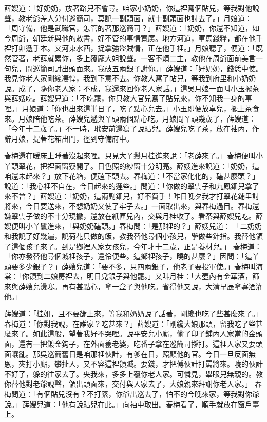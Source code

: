 \begin{showcontents}{}
薛嫂道：「好奶奶，放著路兒不會尋。咱家小奶奶，你這裡寫個貼兒，等我對他說聲，教老爺差人分付巡簡司，莫說一副頭面，就十副頭面也討去了。」月娘道： 「周守備，他是武職官，怎管的著那巡簡司？」薛嫂道：「奶奶，你還不知道，如今周爺，朝廷新與他的敕書，好不管的事情寬廣。地方河道，軍馬錢糧，都在他手裡打卯遞手本。又河東水西，捉拿強盜賊情，正在他手裡。」月娘聽了，便道：「既然管著，老薛就累你，多上覆龐大姐說聲。一客不煩二主，教他在周爺面前美言一句兒，問巡簡司討出頭面來。我破五兩銀子謝你。」薛嫂道：「好奶奶，錢恁中使。我見你老人家剛纔凄惶，我到下意不去。你教人寫了帖兒，等我到府里和小奶奶說。成了，隨你老人家；不成，我還來回你老人家話。」這吳月娘一面叫小玉擺茶與薛嫂吃。薛嫂兒道：「不吃罷，你只教大官兒寫了貼兒來，你不知我一身的事哩。」月娘道：「你也出來這半日了，吃了點心兒去。」小玉即便放卓兒，擺上茶食來。月娘陪他吃茶。薛嫂兒遞與丫頭兩個點心吃。月娘問丫頭幾歲了，薛嫂道： 「今年十二歲了。」不一時，玳安前邊寫了說貼兒。薛嫂兒吃了茶，放在袖內，作辭月娘，提著花箱出門，徑到守備府中。

春梅還在暖床上睡著沒起來哩。只見大丫鬟月桂進來說：「老薛來了。」春梅便叫小丫頭翠花，把裡面窗寮開了。日色照的紗窗十分明亮。薛嫂進來說道：「奶奶，這咱還未起來？」放下花箱，便磕下頭去。春梅道：「不當家化化的，磕甚麼頭？」說道：「我心裡不自在，今日起來的遲些。」問道：「你做的翠雲子和九鳳鈿兒拿了來不曾？」薛嫂道：「奶奶，這兩副鈿兒，好不費手！昨日晚夕我才打翠花鋪里討將來，今日要送來，不想奶奶又使了牢子去。」一面取出來，與春梅過目。春梅還嫌翠雲子做的不十分現撇，還放在紙匣兒內，交與月桂收了。看茶與薛嫂兒吃。薛嫂便叫小丫鬟進來，「與奶奶磕頭。」春梅問：「是那裡的？」薛嫂兒道： 「二奶奶和我說了好幾遍，說荷花只做的飯，教我替他尋個小孩兒，學做些針指。我替他領了這個孩子來了。到是鄉裡人家女孩兒，今年才十二歲，正是養材兒。」 春梅道：「你亦發替他尋個城裡孩子，還伶便些。這鄉裡孩子，曉的甚麼？」因問：「這丫頭要多少銀子？」薛嫂兒道：「要不多，只四兩銀子，他老子要投軍使。」春梅叫海棠：「你領到二娘房裡去，明日兌銀子與他罷。」又叫月桂：「大壺內有金華酒，篩來與薛嫂兒燙寒。再有甚點心，拿一盒子與他吃。省得他又說，大清早辰拿寡酒灌他。」

薛嫂道：「桂姐，且不要篩上來，等我和奶奶說了話著，剛纔也吃了些甚麼來了。」春梅道：「你對我說，在誰家？吃甚來？」薛嫂道：「剛纔大娘那頭，留我吃了些甚麼來了。如此這般，望著我好不哭哩。說平安兒小廝，偷了印子鋪內人家當的金頭面，還有一把鍍金鉤子，在外面養老婆，吃番子拿在巡簡司拶打。這裡人家又要頭面嚷亂。那吳巡簡舊日是咱那裡伙計，有爹在日，照顧他的官。今日一旦反面無恩，夾打小廝，攀扯人，又不容這裡領贓。要錢，才把傅伙計打罵將來。唬的伙計不好了，躲的往家去了。央我來，多多上覆你老人家。可憐見，舉眼兒無親的。教你替他對老爺說聲，領出頭面來，交付與人家去了，大娘親來拜謝你老人家。」 春梅問道：「有個貼兒沒有？不打緊，你爺出巡去了，怕不的今晚來家，等我對你爺說。」薛嫂兒道：「他有說貼兒在此。」向袖中取出。春梅看了，順手就放在窗戶臺上。


\end{showcontents}
